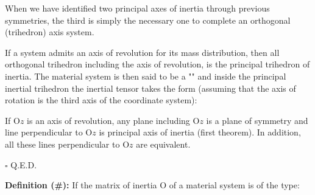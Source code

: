     \begin{tcolorbox}[title=Remark,colframe=black,arc=10pt]
	When we have identified two principal axes of inertia through previous symmetries, the third is simply the necessary one to complete an orthogonal (trihedron) axis system.
	\end{tcolorbox}
    \begin{theorem}
    If a system admits an axis of revolution for its mass distribution, then all orthogonal trihedron including the axis of revolution, is the principal trihedron of  inertia. The material system is then said to be a "" and inside the principal inertial trihedron the inertial tensor takes the form (assuming that the axis of rotation is the third axis of the coordinate system):
    
    \end{theorem}
    \begin{dem}
	If O$z$ is an axis of revolution, any plane including O$z$ is a plane of symmetry and line perpendicular to O$z$ is principal axis of inertia (first theorem). In addition, all these lines perpendicular to O$z$ are equivalent.
	\begin{flushright}
		$\square$  Q.E.D.
	\end{flushright} 
    \end{dem}
    
    \textbf{Definition (\#\mydef):} If the matrix of inertia O of a material system is of the type:
    
